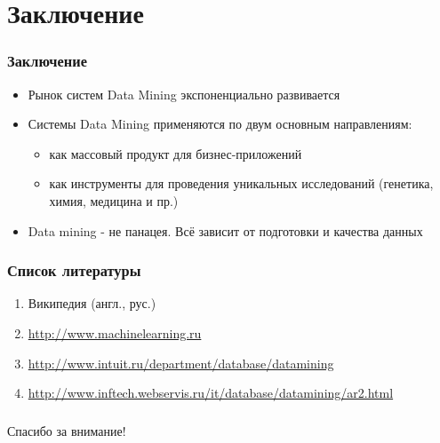 \documentclass[xcolor=table]{beamer}
\begin{document}
\section*{Заключение}
\begin{frame}
  \frametitle{Заключение}

  \begin{itemize}
    \item Рынок систем Data Mining экспоненциально развивается
    \item Системы Data Mining применяются по двум основным направлениям:
      \begin{itemize}
        \item как массовый продукт для бизнес-приложений
        \item как инструменты для проведения уникальных исследований (генетика, химия, медицина и пр.)
      \end{itemize}
    \item Data mining - не панацея. Всё зависит от подготовки и качества данных
  \end{itemize}
\end{frame}

\begin{frame}
  \frametitle{Список литературы}

  \begin{enumerate}
    \item Википедия (англ., рус.)
    \item \url{http://www.machinelearning.ru}
    \item \url{http://www.intuit.ru/department/database/datamining}
    \item \url{http://www.inftech.webservis.ru/it/database/datamining/ar2.html}
  \end{enumerate}
\end{frame}


\begin{frame}
  \frametitle{}
  \framesubtitle{}

  \begin{center}\LARGE{Спасибо за внимание!}\end{center}
\end{frame}
\end{document}
